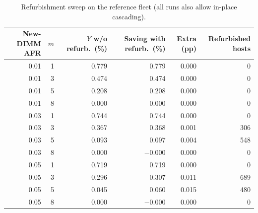 \documentclass{article} %
\begin{document}
\begin{table}[h]
\caption{Refurbishment sweep on the reference fleet (all runs also allow in-place cascading).}
\label{tab:refurb}
\begin{center}
\small
\begin{tabular}{rrrrrr}
\toprule
New-DIMM AFR & $m$ & $Y$ w/o refurb.\ (\%) & Saving with refurb.\ (\%) & Extra (pp) & Refurbished hosts \\
\midrule
0.01 & 1 & 0.779 & 0.779 & 0.000 & 0 \\
0.01 & 3 & 0.474 & 0.474 & 0.000 & 0 \\
0.01 & 5 & 0.208 & 0.208 & 0.000 & 0 \\
0.01 & 8 & 0.000 & 0.000 & 0.000 & 0 \\
0.03 & 1 & 0.744 & 0.744 & 0.000 & 0 \\
0.03 & 3 & 0.367 & 0.368 & 0.001 & 306 \\
0.03 & 5 & 0.093 & 0.097 & 0.004 & 548 \\
0.03 & 8 & 0.000 & $-0.000$ & 0.000 & 0 \\
0.05 & 1 & 0.719 & 0.719 & 0.000 & 0 \\
0.05 & 3 & 0.296 & 0.307 & 0.011 & 689 \\
0.05 & 5 & 0.045 & 0.060 & 0.015 & 480 \\
0.05 & 8 & 0.000 & $-0.000$ & 0.000 & 0 \\
\bottomrule
\end{tabular}
\end{center}
\end{table}
\end{document}
